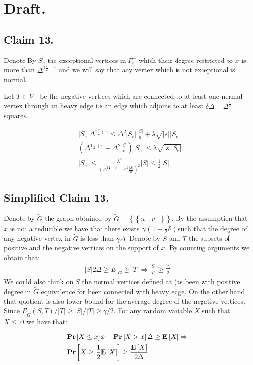 \section{Draft.} 

\subsection{Claim 13.}

Denote By $S_{e}$ the exceptional vertices in $\Gamma^{+}_{\square}$ which their degree restricted to $x$ is more than $\Delta^{1 \frac{1}{2} + \varepsilon}$ and we will say that any vertex which is not exceptional is normal.  

Let $T \subset V^{-}$ be the negative vertices which are connected to at least one normal vertex through an heavy edge i.e an edge which adjoins to at least $\delta\Delta - \Delta^{\frac{1}{2}}$ squares. 


\begin{equation*}
  \begin{split}
    & |S_{e}|\Delta^{1 \frac{1}{2}+ \varepsilon} \le \Delta^{2}|S_{e}|\frac{|S|}{n} +  \lambda \sqrt{|s||S_{e}|} \\ 
    & \left(  \Delta^{1 \frac{1}{2}+ \varepsilon} - \Delta^{2} \frac{|S|}{n}\right)|S_{e}| \le  \lambda \sqrt{|s||S_{e}|}\\
    & |S_{e}| \le \frac{\lambda^{2}}{\left(  \Delta^{1 \frac{1}{2}+ \varepsilon} - \Delta^{2} \frac{|S|}{n} \right)^{2}} |S| \le \frac{1}{2} |S|
  \end{split}
\end{equation*}


\subsection{Simplified Claim 13.} 
\newcommand{\Gtt}{\tilde{G}}
Denote by $\Gtt$ the graph obtained by $\Gtt  = \left\{ \left\{ u^{-}, v^{+} \right\}  \right\} $. By the assumption that $x$ is not a reducible we have that there exists $\gamma$ ( $ 1- \frac{1}{2}\delta$  )  such that the degree of any negative vertex in $\Gtt$ is less than $\gamma\Delta$. Denote by $S$ and $T$ the subsets of positive and the negative vertices on the support of $x$. By counting arguments we obtain that: 
\begin{equation*}
  \begin{split}
    |S| 2\Delta \ge E|_{\Gtt} \ge  |T| \Rightarrow \frac{|S|}{|T|} \ge \frac{\Delta}{2}
  \end{split}
\end{equation*}
We could also think on $S$ the normal vertices defined at \cite{leverrier2022quantum} (as been with positive degree in $\Gtt$ equivalence for been connected with heavy edge. On the other hand that quotient is also lower bound for the average degree of the negative vertices, Since $E_{\Gtt}(S,T)/|T| \ge |S|/|T| \ge \gamma/2$. For any random variable $X$ such that $X \le \Delta$ we have that: 

  \begin{equation*}
    \begin{split}
      & \mathbf{Pr} \left[ {X\le x} \right]x+\mathbf{Pr} \left[ {X > x} \right]\Delta\ge \mathbf{E} \left[ {X} \right]\Rightarrow \\ 
      & \mathbf{Pr} \left[ {X \ge \frac{1}{2} \mathbf{E} \left[ {X} \right] } \right] \ge \frac{\mathbf{E} \left[ {X} \right]}{2\Delta}
    \end{split}
  \end{equation*}

